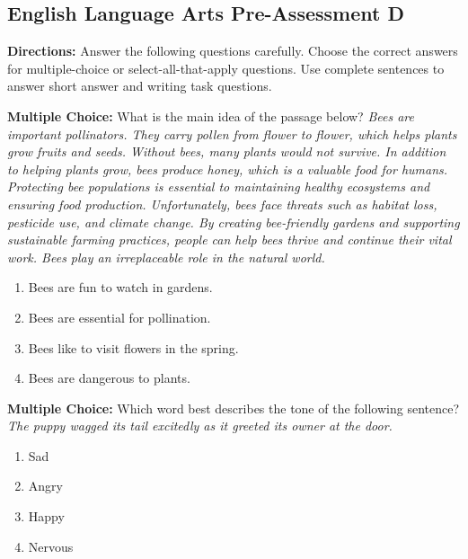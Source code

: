 \documentclass[12pt]{article}
\begin{document}
\subsection*{English Language Arts Pre-Assessment D}
\onehalfspacing

\begin{tcolorbox}[colframe=black!50, colback=white, title=Assessment Directions]
\textbf{Directions:} Answer the following questions carefully. Choose the correct answers for multiple-choice or select-all-that-apply questions. Use complete sentences to answer short answer and writing task questions.
\end{tcolorbox}

\begin{tcolorbox}[colframe=black!50, colback=white, title=Question 1]
\textbf{Multiple Choice:} What is the main idea of the passage below?
\textit{Bees are important pollinators. They carry pollen from flower to flower, which helps plants grow fruits and seeds. Without bees, many plants would not survive. In addition to helping plants grow, bees produce honey, which is a valuable food for humans. Protecting bee populations is essential to maintaining healthy ecosystems and ensuring food production. Unfortunately, bees face threats such as habitat loss, pesticide use, and climate change. By creating bee-friendly gardens and supporting sustainable farming practices, people can help bees thrive and continue their vital work. Bees play an irreplaceable role in the natural world.}

\begin{enumerate}[label=(\Alph*)]
\item Bees are fun to watch in gardens.
\item Bees are essential for pollination.
\item Bees like to visit flowers in the spring.
\item Bees are dangerous to plants.
\end{enumerate}
\end{tcolorbox}

\begin{tcolorbox}[colframe=black!50, colback=white, title=Question 2]
\textbf{Multiple Choice:} Which word best describes the tone of the following sentence?
\textit{The puppy wagged its tail excitedly as it greeted its owner at the door.}

\begin{enumerate}[label=(\Alph*)]
\item Sad
\item Angry
\item Happy
\item Nervous
\end{enumerate}
\end{tcolorbox}
\end{document}
